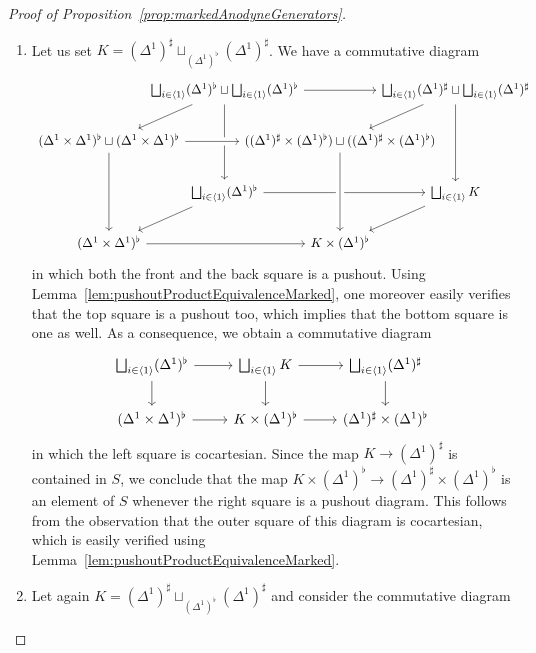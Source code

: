 \documentclass[reqno]{amsart}
\numberwithin{equation}{subsection}
\theoremstyle{plain}
\theoremstyle{definition}
\newcommand{\ord}[1]{\langle#1\rangle}
\begin{document}
\begin{proof}[{Proof of Proposition~\ref{prop:markedAnodyneGenerators}}]
\begin{enumerate}[resume]
	\item	Let us set $K= (\Delta^1)^\sharp\sqcup_{(\Delta^1)^\flat}(\Delta^1)^\sharp$. We have a commutative diagram
	\begin{equation*}
	\begin{tikzcd}[column sep={9em,between origins}, row sep={4em,between origins}]
		& \bigsqcup_{i\in \ord{1}}(\Delta^1)^\flat \sqcup \bigsqcup_{i\in \ord{1}}(\Delta^1)^\flat \arrow[rr]\arrow[dl]\arrow[dd] && \bigsqcup_{i\in \ord{1}}(\Delta^1)^\sharp \sqcup \bigsqcup_{i\in \ord{1}}(\Delta^1)^\sharp\arrow[dl]\arrow[dd]\\
		(\Delta^1\times\Delta^1)^\flat\sqcup (\Delta^1\times\Delta^1)^\flat\arrow[rr, crossing over]\arrow[dd] && ((\Delta^1)^\sharp\times(\Delta^1)^\flat)\sqcup ((\Delta^1)^\sharp\times(\Delta^1)^\flat)\arrow[dd] & \\
		&\bigsqcup_{i\in \ord{1}}(\Delta^1)^\flat \arrow[rr] \arrow[dl] && \bigsqcup_{i\in \ord{1}} K\arrow[dl]\\
		(\Delta^1\times\Delta^1)^\flat\arrow[rr] && K\times(\Delta^1)^\flat\arrow[from=uu, crossing over]
	\end{tikzcd}
	\end{equation*}
	in which both the front and the back square is a pushout. Using Lemma~\ref{lem:pushoutProductEquivalenceMarked}, one moreover easily verifies that the top square is a pushout too, which implies that the bottom square is one as well. As a consequence, we obtain a commutative diagram
	\begin{equation*}
	\begin{tikzcd}
	\bigsqcup_{i\in \ord{1}} (\Delta^1)^\flat\arrow[r]\arrow[d] & \bigsqcup_{i\in \ord{1}} K\arrow[r] \arrow[d]& \bigsqcup_{i\in \ord{1}} (\Delta^1)^\sharp\arrow[d]\\
	(\Delta^1\times\Delta^1)^\flat\arrow[r] & K\times(\Delta^1)^\flat\arrow[r] & (\Delta^1)^\sharp\times(\Delta^1)^\flat
	\end{tikzcd}
	\end{equation*}
	in which the left square is cocartesian. Since the map $K\to (\Delta^1)^\sharp$ is contained in $S$, we conclude that the map $K\times(\Delta^1)^\flat\to (\Delta^1)^\sharp\times(\Delta^1)^\flat$ is an element of $S$ whenever the right square is a pushout diagram. This follows from the observation that the outer square of this diagram is cocartesian, which is easily verified using Lemma~\ref{lem:pushoutProductEquivalenceMarked}.
	\item Let again $K= (\Delta^1)^\sharp\sqcup_{(\Delta^1)^\flat}(\Delta^1)^\sharp$ and consider the commutative diagram

\end{enumerate}
\end{proof}
\end{document}
